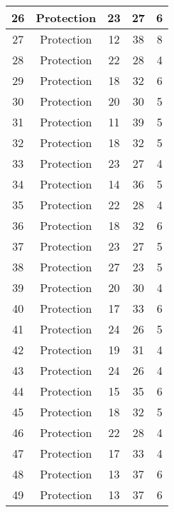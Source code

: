 \documentclass[results.tex]{subfiles}
\begin{document}
\begin{center}
\begin{tabular}{| c || c | c | c | c |}
    \hline
    26 & Protection & 23 & 27 & 6 \\ 
    \hline
    27 & Protection & 12 & 38 & 8 \\ 
    \hline
    28 & Protection & 22 & 28 & 4 \\ 
    \hline
    29 & Protection & 18 & 32 & 6 \\ 
    \hline
    30 & Protection & 20 & 30 & 5 \\ 
    \hline
    31 & Protection & 11 & 39 & 5 \\ 
    \hline
    32 & Protection & 18 & 32 & 5 \\ 
    \hline
    33 & Protection & 23 & 27 & 4 \\ 
    \hline
    34 & Protection & 14 & 36 & 5 \\ 
    \hline
    35 & Protection & 22 & 28 & 4 \\ 
    \hline
    36 & Protection & 18 & 32 & 6 \\ 
    \hline
    37 & Protection & 23 & 27 & 5 \\ 
    \hline
    38 & Protection & 27 & 23 & 5 \\ 
    \hline
    39 & Protection & 20 & 30 & 4 \\ 
    \hline
    40 & Protection & 17 & 33 & 6 \\ 
    \hline
    41 & Protection & 24 & 26 & 5 \\ 
    \hline
    42 & Protection & 19 & 31 & 4 \\ 
    \hline
    43 & Protection & 24 & 26 & 4 \\ 
    \hline
    44 & Protection & 15 & 35 & 6 \\ 
    \hline
    45 & Protection & 18 & 32 & 5 \\ 
    \hline
    46 & Protection & 22 & 28 & 4 \\ 
    \hline
    47 & Protection & 17 & 33 & 4 \\ 
    \hline
    48 & Protection & 13 & 37 & 6 \\ 
    \hline
    49 & Protection & 13 & 37 & 6 \\ 
    \hline   \end{tabular}
\end{center}
\end{document}
